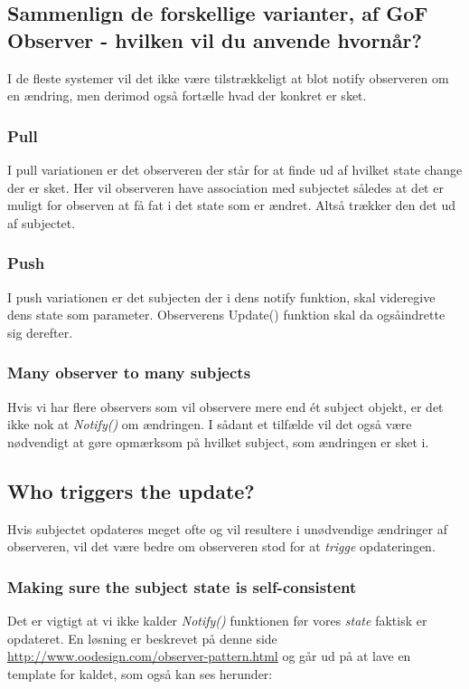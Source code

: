 \subsection{Sammenlign de forskellige varianter, af GoF Observer - hvilken vil du anvende hvornår?}
I de fleste systemer vil det ikke være tilstrækkeligt at blot notify observeren om en ændring, men derimod også fortælle hvad der konkret er sket.

\subsubsection{Pull}
I pull variationen er det observeren der står for at finde ud af hvilket state change der er sket. Her vil observeren have association med subjectet således at det er muligt for observen at få fat i det state som er ændret. Altså trækker den det ud af subjectet.

\subsubsection{Push}
I push variationen er det subjecten der i dens notify funktion, skal videregive dens state som parameter. Observerens Update() funktion skal da ogsåindrette sig derefter. 

\subsubsection{Many observer to many subjects}
Hvis vi har flere observers som vil observere mere end ét subject objekt, er det ikke nok at \textit{Notify()} om ændringen. I sådant et tilfælde vil det også være nødvendigt at gøre opmærksom på hvilket subject, som ændringen er sket i.

\subsection{Who triggers the update?}
Hvis subjectet opdateres meget ofte og vil resultere i unødvendige ændringer af observeren, vil det være bedre om observeren stod for at \textit{trigge} opdateringen.

\subsubsection{Making sure the subject state is self-consistent}
Det er vigtigt at vi ikke kalder \textit{Notify()} funktionen før vores \textit{state} faktisk er opdateret. En løsning er beskrevet på denne side \url{http://www.oodesign.com/observer-pattern.html} og går ud på at lave en template for kaldet, som også kan ses herunder:

